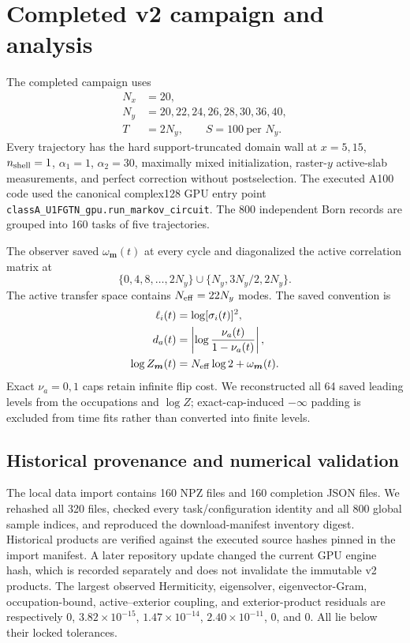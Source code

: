 \documentclass[aps,prb,twocolumn,floatfix,nofootinbib,superscriptaddress]{revtex4-2}
\begin{document}
\section{Completed v2 campaign and analysis}

The completed campaign uses
\begin{align}
 N_x&=20,\\
 N_y&=20,22,24,26,28,30,36,40,\\
 T&=2N_y,\qquad S=100\ \text{per }N_y.
 \label{eq:pilot-grid}
\end{align}
Every trajectory has the hard support-truncated domain wall at \(x=5,15\), \(n_{\rm shell}=1\), \(\alpha_1=1\), \(\alpha_2=30\), maximally mixed initialization, raster-\(y\) active-slab measurements, and perfect correction without postselection.  The executed A100 code used the canonical complex128 GPU entry point \texttt{classA\_U1FGTN\_gpu.run\_markov\_circuit}.  The 800 independent Born records are grouped into 160 tasks of five trajectories.

The observer saved \(\omega_{\boldsymbol m}(t)\) at every cycle and diagonalized the active correlation matrix at
\begin{equation}
 \{0,4,8,\ldots,2N_y\}\cup\{N_y,3N_y/2,2N_y\}.
 \label{eq:pilot-checkpoints}
\end{equation}
The active transfer space contains \(N_{\rm eff}=22N_y\) modes.  The saved convention is
\begin{align}
 \ell_i(t)&=\log [\sigma_i(t)]^2,\\
 d_a(t)&=\left|\log\frac{\nu_a(t)}{1-\nu_a(t)}\right|,\\
 \log Z_{\boldsymbol m}(t)&=N_{\rm eff}\log 2+\omega_{\boldsymbol m}(t).
 \label{eq:pilot-squared-convention}
\end{align}
Exact \(\nu_a=0,1\) caps retain infinite flip cost.  We reconstructed all 64 saved leading levels from the occupations and \(\log Z\); exact-cap-induced \(-\infty\) padding is excluded from time fits rather than converted into finite levels.

\subsection{Historical provenance and numerical validation}

The local data import contains 160 NPZ files and 160 completion JSON files.  We rehashed all 320 files, checked every task/configuration identity and all 800 global sample indices, and reproduced the download-manifest inventory digest.  Historical products are verified against the executed source hashes pinned in the import manifest.  A later repository update changed the current GPU engine hash, which is recorded separately and does not invalidate the immutable v2 products.  The largest observed Hermiticity, eigensolver, eigenvector-Gram, occupation-bound, active--exterior coupling, and exterior-product residuals are respectively $0$, $3.82\times10^{-15}$, $1.47\times10^{-14}$, $2.40\times10^{-11}$, $0$, and $0$.  All lie below their locked tolerances.
\end{document}
